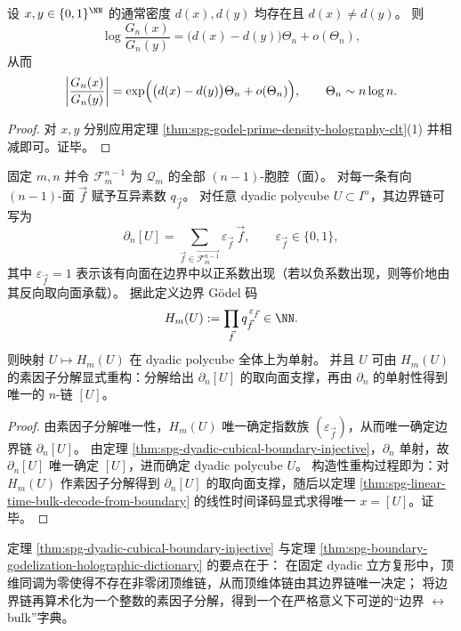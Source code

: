 \begin{corollary}\label{cor:spg-godel-prime-ratio-density}
设 \(x,y\in\{0,1\}^{\NN}\) 的通常密度 \(d(x),d(y)\) 均存在且 \(d(x)\neq d(y)\)。
则
\[
\log\frac{G_n(x)}{G_n(y)}
=
\bigl(d(x)-d(y)\bigr)\Theta_n+o(\Theta_n),
\]
从而
\[
\left|\frac{G_n(x)}{G_n(y)}\right|
=
\exp\Bigl(\bigl(d(x)-d(y)\bigr)\Theta_n+o(\Theta_n)\Bigr),
\qquad
\Theta_n\sim n\log n.
\]
\end{corollary}
\begin{proof}
对 \(x,y\) 分别应用定理 \ref{thm:spg-godel-prime-density-holography-clt}(1) 并相减即可。证毕。
\end{proof}

\begin{theorem}\label{thm:spg-boundary-godelization-holographic-dictionary}
固定 \(m,n\) 并令 \(\mathcal F_{m}^{n-1}\) 为 \(\mathcal Q_m\) 的全部 \((n-1)\)-胞腔（面）。
对每一条有向 \((n-1)\)-面 \(\vec f\) 赋予互异素数 \(q_{\vec f}\)。
对任意 dyadic polycube \(U\subset I^n\)，其边界链可写为
\[
\partial_n[U]=\sum_{\vec f\in \overrightarrow{\mathcal F_{m}^{n-1}}} \varepsilon_{\vec f}\,\vec f,
\qquad \varepsilon_{\vec f}\in\{0,1\},
\]
其中 \(\varepsilon_{\vec f}=1\) 表示该有向面在边界中以正系数出现（若以负系数出现，则等价地由其反向取向面承载）。
据此定义边界 Gödel 码
\[
H_m(U):=\prod_{\vec f} q_{\vec f}^{\,\varepsilon_{\vec f}}\in\NN.
\]
则映射 \(U\mapsto H_m(U)\) 在 dyadic polycube 全体上为单射。
并且 \(U\) 可由 \(H_m(U)\) 的素因子分解显式重构：分解给出 \(\partial_n[U]\) 的取向面支撑，再由 \(\partial_n\) 的单射性得到唯一的 \(n\)-链 \([U]\)。
\end{theorem}
\begin{proof}
由素因子分解唯一性，\(H_m(U)\) 唯一确定指数族 \((\varepsilon_{\vec f})\)，从而唯一确定边界链 \(\partial_n[U]\)。
由定理 \ref{thm:spg-dyadic-cubical-boundary-injective}，\(\partial_n\) 单射，故 \(\partial_n[U]\) 唯一确定 \([U]\)，进而确定 dyadic polycube \(U\)。
构造性重构过程即为：对 \(H_m(U)\) 作素因子分解得到 \(\partial_n[U]\) 的取向面支撑，随后以定理 \ref{thm:spg-linear-time-bulk-decode-from-boundary} 的线性时间译码显式求得唯一 \(x=[U]\)。证毕。
\end{proof}



\begin{remark}[离散全息字典的链层刚性]\label{rem:spg-dyadic-holography-chain-level}
定理 \ref{thm:spg-dyadic-cubical-boundary-injective} 与定理 \ref{thm:spg-boundary-godelization-holographic-dictionary} 的要点在于：
在固定 dyadic 立方复形中，顶维同调为零使得不存在非零闭顶维链，从而顶维体链由其边界链唯一决定；
将边界链再算术化为一个整数的素因子分解，得到一个在严格意义下可逆的“边界 \(\leftrightarrow\) bulk”字典。
\end{remark}

